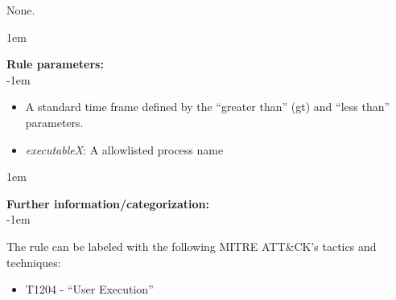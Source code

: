 None.

\openup 1em

{\bf Rule parameters:} \\

\openup -1em
\vspace{-2em}

\begin{itemize}
	\item A standard time frame defined by the ``greater than'' (gt) and ``less than'' parameters.
	\item \emph{executableX}: A allowlisted process name
\end{itemize}

\openup 1em

{\bf Further information/categorization:} \\

\openup -1em
\vspace{-2em}


The rule can be labeled with the following MITRE ATT\&CK's tactics and techniques:
\begin{itemize}
	\item T1204 - ``User Execution''
\end{itemize}

\pagebreak

